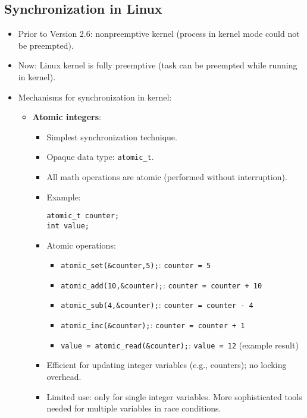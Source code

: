\subsection{Synchronization in Linux}
\begin{itemize}
    \item Prior to Version 2.6: nonpreemptive kernel (process in kernel mode could not be preempted).
    \item Now: Linux kernel is fully preemptive (task can be preempted while running in kernel).
    \item Mechanisms for synchronization in kernel:
    \begin{itemize}
        \item \textbf{Atomic integers}:
        \begin{itemize}
            \item Simplest synchronization technique.
            \item Opaque data type: \texttt{atomic\_t}.
            \item All math operations are atomic (performed without interruption).
            \item Example:
            \begin{verbatim}
atomic_t counter;
int value;
            \end{verbatim}
            \item Atomic operations:
            \begin{itemize}
                \item \texttt{atomic\_set(\&counter,5);}: \texttt{counter = 5}
                \item \texttt{atomic\_add(10,\&counter);}: \texttt{counter = counter + 10}
                \item \texttt{atomic\_sub(4,\&counter);}: \texttt{counter = counter - 4}
                \item \texttt{atomic\_inc(\&counter);}: \texttt{counter = counter + 1}
                \item \texttt{value = atomic\_read(\&counter);}: \texttt{value = 12} (example result)
            \end{itemize}
            \item Efficient for updating integer variables (e.g., counters); no locking overhead.
            \item Limited use: only for single integer variables. More sophisticated tools needed for multiple variables in race conditions.
        \end{itemize}

\end{itemize}
\end{itemize}
